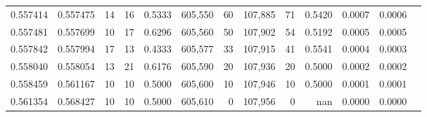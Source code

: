 \begin{tabular}{rrrrrrrrrrrrr}
0.557414 & 0.557475 &    14 &    16 &                                     0.5333 & 605,550 &      60 & 107,885 &      71 & 0.5420 & 0.0007 & 0.0006 \\
0.557481 & 0.557699 &    10 &    17 &                                     0.6296 & 605,560 &      50 & 107,902 &      54 & 0.5192 & 0.0005 & 0.0005 \\
0.557842 & 0.557994 &    17 &    13 &                                     0.4333 & 605,577 &      33 & 107,915 &      41 & 0.5541 & 0.0004 & 0.0003 \\
0.558040 & 0.558054 &    13 &    21 &                                     0.6176 & 605,590 &      20 & 107,936 &      20 & 0.5000 & 0.0002 & 0.0002 \\
0.558459 & 0.561167 &    10 &    10 &                                     0.5000 & 605,600 &      10 & 107,946 &      10 & 0.5000 & 0.0001 & 0.0001 \\
0.561354 & 0.568427 &    10 &    10 &                                     0.5000 & 605,610 &       0 & 107,956 &       0 &    nan & 0.0000 & 0.0000 \\
\bottomrule
\end{tabular}
